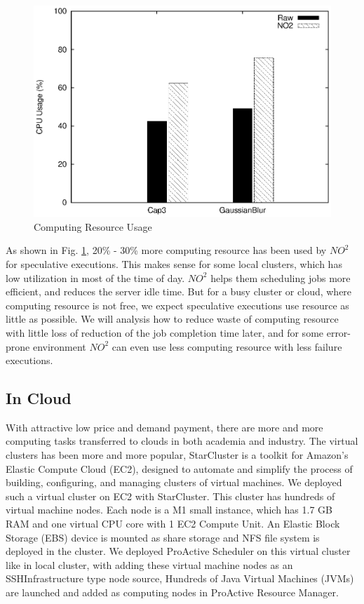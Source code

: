 \begin{figure}
\centering
\includegraphics[width=0.9\columnwidth]{figures/resource_usage.eps}
\caption{Computing Resource Usage}
\label{figure:resourceusage}
\end{figure}

As shown in Fig. \ref{figure:resourceusage}, 20\% - 30\% more computing resource has been used by $NO^2$ for speculative executions. This makes sense for some local clusters, which has low utilization in most of the time of day. $NO^2$ helps them scheduling jobs more efficient, and reduces the server idle time. But for a busy cluster or cloud, where computing resource is not free, we expect speculative executions use resource as little as possible. We will analysis how to reduce waste of computing resource with little loss of reduction of the job completion time later, and for some error-prone environment $NO^2$ can even use less computing resource with less failure executions.

\subsection{In Cloud}

With attractive low price and demand payment, there are more and more computing tasks transferred to clouds in both academia and industry. The virtual clusters has been more and more popular, StarCluster \cite{starcluster} is a toolkit for Amazon’s Elastic Compute Cloud (EC2), designed to automate and simplify the process of building, configuring, and managing clusters of virtual machines. We deployed such a virtual cluster on EC2 with StarCluster. This cluster has hundreds of virtual machine nodes. Each node is a M1 small instance, which has 1.7 GB RAM and one virtual CPU core with 1 EC2 Compute Unit. An Elastic Block Storage (EBS) device is mounted as share storage and NFS file system is deployed in the cluster. We deployed ProActive Scheduler on this virtual cluster like in local cluster, with adding these virtual machine nodes as an SSHInfrastructure type node source, Hundreds of Java Virtual Machines (JVMs) are launched and added as computing nodes in ProActive Resource Manager.

